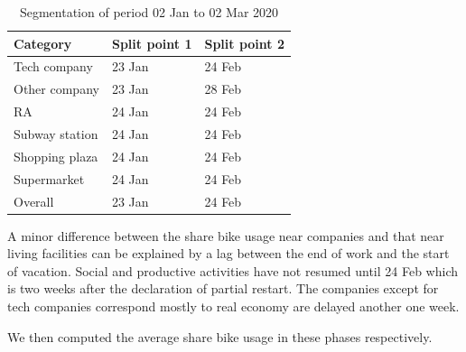 \documentclass[ijgi,submit,moreauthors,pdftex]{Definitions/mdpi}
\begin{document}
\begin{table}[ht]
	\centering
	\begin{tabular}{|l|l|l|}
		\hline
		Category & Split point 1 & Split point 2\\
		\hline
		Tech company & 23 Jan & 24 Feb\\
		\hline
		Other company & 23 Jan & 28 Feb\\
		\hline
		RA & 24 Jan & 24 Feb\\
		\hline
		Subway station & 24 Jan & 24 Feb\\
		\hline
		Shopping plaza & 24 Jan & 24 Feb\\
		\hline
		Supermarket & 24 Jan & 24 Feb\\
		\hline
		Overall & 23 Jan & 24 Feb \\
		\hline
	\end{tabular}
	\caption{Segmentation of period 02 Jan to 02 Mar 2020}\label{tab:segment}
\end{table}

A minor difference between the share bike usage near companies and that near living facilities can be explained by a lag between the end of work and the start of vacation.
Social and productive activities have not resumed until 24 Feb which is two weeks after the declaration of partial restart.
The companies except for tech companies correspond mostly to real economy are delayed another one week.

We then computed the average share bike usage in these phases respectively.
\end{document}
